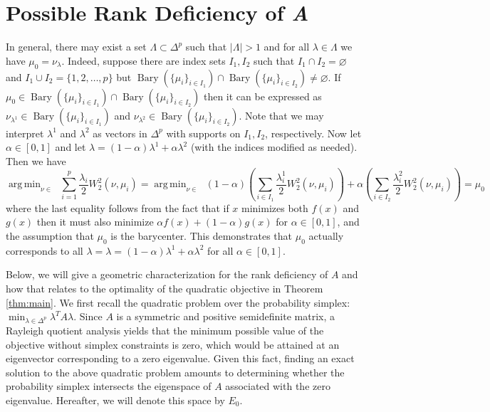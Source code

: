 \documentclass[nohyperref]{article}
\DeclareMathOperator*{\argmin}{arg\,min}
\DeclareMathOperator*{\bary}{Bary}
\DeclareMathOperator{\Pac}{\mathcal{P}_{2,ac}(\mathbb{R}^d)}
\theoremstyle{definition}
\begin{document}
\section{Possible Rank Deficiency of \textit{A}} \label{sec:rank_def}

In general, there may exist a set $\Lambda \subset \Delta^p$ such that $|\Lambda| > 1$ and for all $\lambda \in \Lambda$ we have $\mu_0 = \nu_{\lambda}$. Indeed, suppose there are index sets $I_1, I_2$ such that $I_1 \cap I_2 = \varnothing$ and $I_{1}\cup I_{2} = \{1,2,\dots, p\}$ but $\bary(\{\mu_{i}\}_{i\in I_{1}}) \cap \bary(\{\mu_{i}\}_{i\in I_{2}}) \neq \varnothing$.  If $\mu_0 \in \bary(\{\mu_{i}\}_{i\in I_{1}}) \cap \bary(\{\mu_{i}\}_{i\in I_{2}})$ then it can be expressed as $\nu_{\lambda^1} \in \bary(\{\mu_{i}\}_{i\in I_{1}})$ and $\nu_{\lambda^2} \in \bary(\{\mu_{i}\}_{i\in I_{2}}).$  Note that we may interpret $\lambda^{1}$ and $\lambda^{2}$ as vectors in $\Delta^{p}$ with supports on $I_{1}, I_{2}$, respectively.  Now let $\alpha \in [0,1]$ and let $\lambda = (1-\alpha)\lambda^1 + \alpha\lambda^2$ (with the indices modified as needed). Then we have
$$
\argmin_{\nu \in \Pac} \sum_{i=1}^p \frac{\lambda_i}{2} W_2^2(\nu, \mu_i) = \argmin_{\nu \in \Pac} (1-\alpha)\left ( \sum_{i \in I_1} \frac{\lambda^1_i}{2} W_2^2(\nu, \mu_i)\right ) + \alpha\left ( \sum_{i \in I_2} \frac{\lambda^2_i}{2} W_2^2(\nu, \mu_i)\right ) = \mu_0
$$
where the last equality follows from the fact that if $x$ minimizes both $f(x)$ and $g(x)$ then it must also minimize $\alpha f(x) + (1-\alpha) g(x)$ for $\alpha \in [0,1]$, and the assumption that $\mu_0$ is the barycenter. This demonstrates that $\mu_0$ actually corresponds to all $\lambda = \lambda = (1-\alpha)\lambda^1 + \alpha\lambda^2$ for all $\alpha \in [0,1]$. 

Below, we will give a geometric characterization for the rank deficiency of $A$ and how that relates to the optimality of the quadratic objective in Theorem \ref{thm:main}. We first recall the quadratic problem over the probability simplex: $\min_{\lambda\in\Delta^{p}} \lambda^TA\lambda$.  Since $A$ is a symmetric and positive semidefinite matrix, a Rayleigh quotient analysis yields that the minimum possible value of the objective without simplex constraints is zero, which would be attained at an eigenvector corresponding to a zero eigenvalue. Given this fact, finding an exact solution to the above quadratic problem amounts to determining whether the probability simplex intersects the eigenspace of $A$ associated with the zero eigenvalue. Hereafter, we will denote this space by $E_{0}$. 
\end{document}
